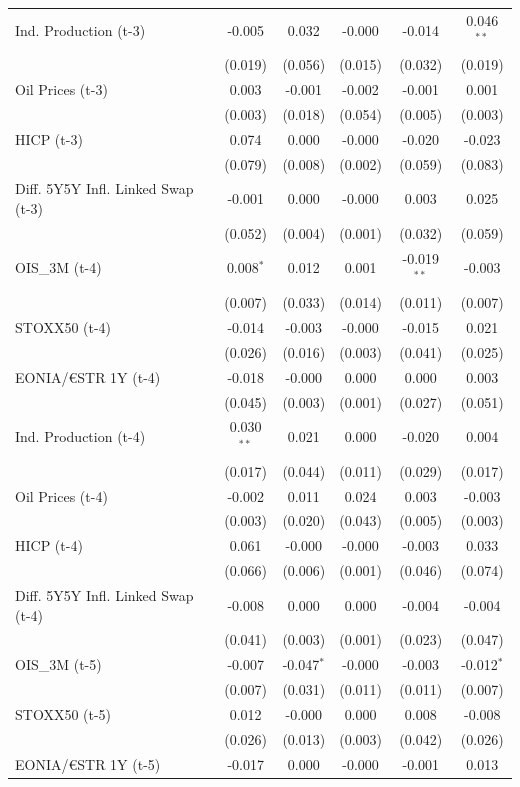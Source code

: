 \begin{longtable}[t]{lccccc}
Ind. Production (t-3) & -0.005 & 0.032 & -0.000 & -0.014 & 0.046$^{**}$\\
 & (0.019) & (0.056) & (0.015) & (0.032) & (0.019)\\
Oil Prices (t-3) & 0.003 & -0.001 & -0.002 & -0.001 & 0.001\\
 & (0.003) & (0.018) & (0.054) & (0.005) & (0.003)\\
HICP (t-3) & 0.074 & 0.000 & -0.000 & -0.020 & -0.023\\
 & (0.079) & (0.008) & (0.002) & (0.059) & (0.083)\\
Diff. 5Y5Y Infl. Linked Swap (t-3) & -0.001 & 0.000 & -0.000 & 0.003 & 0.025\\
 & (0.052) & (0.004) & (0.001) & (0.032) & (0.059)\\
OIS\_3M (t-4) & 0.008$^{*}$ & 0.012 & 0.001 & -0.019$^{**}$ & -0.003\\
 & (0.007) & (0.033) & (0.014) & (0.011) & (0.007)\\
STOXX50 (t-4) & -0.014 & -0.003 & -0.000 & -0.015 & 0.021\\
 & (0.026) & (0.016) & (0.003) & (0.041) & (0.025)\\
EONIA/€STR 1Y (t-4) & -0.018 & -0.000 & 0.000 & 0.000 & 0.003\\
 & (0.045) & (0.003) & (0.001) & (0.027) & (0.051)\\
Ind. Production (t-4) & 0.030$^{**}$ & 0.021 & 0.000 & -0.020 & 0.004\\
 & (0.017) & (0.044) & (0.011) & (0.029) & (0.017)\\
Oil Prices (t-4) & -0.002 & 0.011 & 0.024 & 0.003 & -0.003\\
 & (0.003) & (0.020) & (0.043) & (0.005) & (0.003)\\
HICP (t-4) & 0.061 & -0.000 & -0.000 & -0.003 & 0.033\\
 & (0.066) & (0.006) & (0.001) & (0.046) & (0.074)\\
Diff. 5Y5Y Infl. Linked Swap (t-4) & -0.008 & 0.000 & 0.000 & -0.004 & -0.004\\
 & (0.041) & (0.003) & (0.001) & (0.023) & (0.047)\\
OIS\_3M (t-5) & -0.007 & -0.047$^{*}$ & -0.000 & -0.003 & -0.012$^{*}$\\
 & (0.007) & (0.031) & (0.011) & (0.011) & (0.007)\\
STOXX50 (t-5) & 0.012 & -0.000 & 0.000 & 0.008 & -0.008\\
 & (0.026) & (0.013) & (0.003) & (0.042) & (0.026)\\
EONIA/€STR 1Y (t-5) & -0.017 & 0.000 & -0.000 & -0.001 & 0.013\\

\end{longtable}
